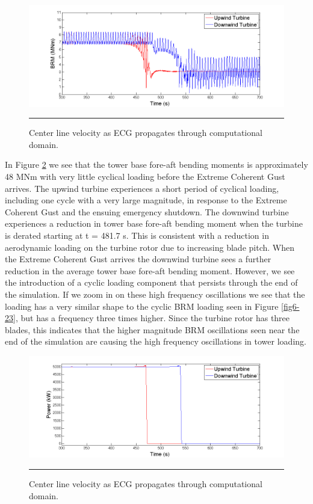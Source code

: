 \begin{figure}[htbp] \label{fig6-24}
	\centering
		\includegraphics[trim = {1cm 0 2cm 0}, clip, width = \linewidth]{Figures/ch6Figures/fig6-24.png}
		\rule{35em}{0.5pt}
	\caption{Center line velocity as ECG propagates through computational domain.}
\end{figure}

In Figure \ref{fig6-25} we see that the tower base fore-aft bending moments is approximately 48 MNm with very little cyclical loading before the Extreme Coherent Gust arrives. The upwind turbine experiences a short period of cyclical loading, including one cycle with a very large magnitude, in response to the Extreme Coherent Gust and the ensuing emergency shutdown. The downwind turbine experiences a reduction in tower base fore-aft bending moment when the turbine is derated starting at t = 481.7 s. This is consistent with a reduction in aerodynamic loading on the turbine rotor due to increasing blade pitch. When the Extreme Coherent Gust arrives the downwind turbine sees a further reduction in the average tower base fore-aft bending moment. However, we see the introduction of a cyclic loading component that persists through the end of the simulation. If we zoom in on these high frequency oscillations we see that the loading has a very similar shape to the cyclic BRM loading seen in Figure \ref{fig6-23}, but has a frequency three times higher. Since the turbine rotor has three blades, this indicates that the higher magnitude BRM oscillations seen near the end of the simulation are causing the high frequency oscillations in tower loading. 

\begin{figure}[htbp] \label{fig6-25}
	\centering
		\includegraphics[trim = {1cm 0 2cm 0}, clip, width = \linewidth]{Figures/ch6Figures/fig6-16.png}
		\rule{35em}{0.5pt}
	\caption{Center line velocity as ECG propagates through computational domain.}
\end{figure}

